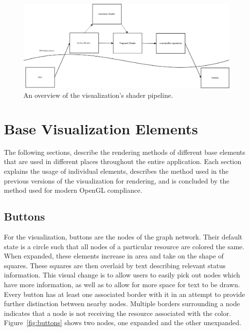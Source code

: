 \begin{figure}[htp] \centering
    \includegraphics[width=150mm]{img/pipeline.jpg}
    \caption[Infrastructure Visualization Shader Pipeline]{An overview of the visualization's shader pipeline.}
    \label{fig:shader_pipeline}
\end{figure}

\section{Base Visualization Elements}
\label{section:base_mapview_elements}

The following sections, describe the rendering methods of different base elements that are used in different places throughout the entire application. Each section explains the usage of individual elements, describes the method used in the previous versions of the visualization for rendering, and is concluded by the method used for modern OpenGL compliance.

\subsection{Buttons}
\label{subsection:buttons}
For the visualization, buttons are the nodes of the graph network. Their default state is a circle such that all nodes of a particular resource are colored the same. When expanded, these elements increase in area and take on the shape of squares. These squares are then overlaid by text describing relevant status information. This visual change is to allow users to easily pick out nodes which have more information, as well as to allow for more space for text to be drawn. Every button has at least one associated border
with it in an attempt to provide further distinction between nearby nodes. Multiple borders surrounding a node indicates that a node is not receiving the resource associated with the color. Figure~\ref{fig:buttons} shows two nodes, one expanded and the other unexpanded.

